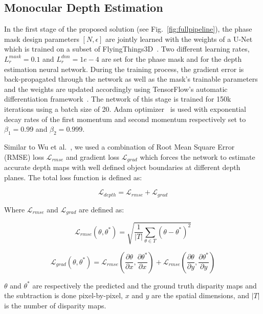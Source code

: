 \documentclass[preprint,5p,twocolumn]{elsarticle}
\begin{document}
\subsection{Monocular Depth Estimation}

In the first stage of the proposed solution (see Fig.~\ref{fig:fullpipeline}), the phase mask design parameters $[N,\epsilon]$ are jointly learned with the weights of a U-Net~\cite{ronneberger2015u} which is trained on a subset of FlyingThings3D~\cite{MIFDB16}. Two different learning rates, $L_r^{mask}=0.1$ and $L_r^{dnn}=1e-4$ are set for the phase mask and for the depth estimation neural network. During the training process, the gradient error is back-propagated through the network as well as the mask's trainable parameters and the weights are updated accordingly using TensorFlow's automatic differentiation framework~\cite{tensorflow2015-whitepaper}. The network of this stage is trained for 150k iterations using a batch size of 20. Adam optimizer~\cite{kingma2014adam} is used with exponential decay rates of the first momentum and second momentum respectively set to $\beta_{1}=0.99$ and $\beta_{2}=0.999$. 

Similar to Wu et al.~\cite{wu2019phasecam3d}, we used a combination of Root Mean Square Error (RMSE) loss $\mathcal{L}_{rmse}$ and gradient loss $\mathcal{L}_{grad}$ which forces the network to estimate accurate depth maps with well defined object boundaries at different depth planes. The total loss function is defined as:

\begin{equation}
    \mathcal{L}_{depth} = \mathcal{L}_{rmse} + \mathcal{L}_{grad}
\end{equation}

Where $\mathcal{L}_{rmse}$ and $\mathcal{L}_{grad}$ are defined as:

\begin{equation}
    \mathcal{L}_{rmse}(\theta,\theta^{*}) = \sqrt{\frac{1}{|T|}\sum_{\theta\in T}(\theta-\theta^{*})^{2}}
\end{equation}

\begin{equation}
    \mathcal{L}_{grad} (\theta,\theta^{*}) =\mathcal{L}_{rmse}(\frac{\partial \theta}{\partial x},\frac{\partial \theta^{*}}{\partial x})+\mathcal{L}_{rmse}(\frac{\partial \theta}{\partial y},\frac{\partial \theta^{*}}{\partial y})
\end{equation}

$\theta$ and $\theta^{*}$ are respectively the predicted and the ground truth disparity maps and the subtraction is done pixel-by-pixel, $x$ and $y$ are the spatial dimensions, and $|T|$ is the number of disparity maps.
\end{document}
